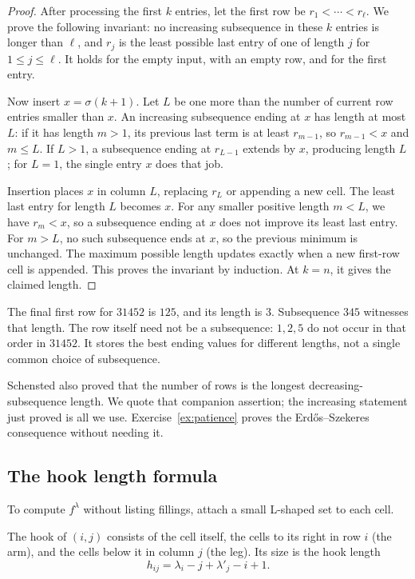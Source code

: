 \begin{proof}
After processing the first $k$ entries, let the first row be $r_1<\cdots<r_\ell$. We prove the following invariant: no increasing subsequence in these $k$ entries is longer than $\ell$, and $r_j$ is the least possible last entry of one of length $j$ for $1\le j\le\ell$. It holds for the empty input, with an empty row, and for the first entry.

Now insert $x=\sigma(k+1)$. Let $L$ be one more than the number of current row entries smaller than $x$. An increasing subsequence ending at $x$ has length at most $L$: if it has length $m>1$, its previous last term is at least $r_{m-1}$, so $r_{m-1}<x$ and $m\le L$. If $L>1$, a subsequence ending at $r_{L-1}$ extends by $x$, producing length $L$; for $L=1$, the single entry $x$ does that job.

Insertion places $x$ in column $L$, replacing $r_L$ or appending a new cell. The least last entry for length $L$ becomes $x$. For any smaller positive length $m<L$, we have $r_m<x$, so a subsequence ending at $x$ does not improve its least last entry. For $m>L$, no such subsequence ends at $x$, so the previous minimum is unchanged. The maximum possible length updates exactly when a new first-row cell is appended. This proves the invariant by induction. At $k=n$, it gives the claimed length.
\end{proof}

The final first row for $31452$ is $125$, and its length is $3$. Subsequence $345$ witnesses that length. The row itself need not be a subsequence: $1,2,5$ do not occur in that order in $31452$. It stores the best ending values for different lengths, not a single common choice of subsequence.

Schensted also proved that the number of rows is the longest decreasing-subsequence length. We quote that companion assertion; the increasing statement just proved is all we use. Exercise~\ref{ex:patience} proves the Erdős--Szekeres consequence without needing it.

\subsection*{The hook length formula}

To compute $f^\lambda$ without listing fillings, attach a small L-shaped set to each cell.

\begin{definition}\label{def:hook}
The hook of $(i,j)$ consists of the cell itself, the cells to its right in row $i$ (the arm), and the cells below it in column $j$ (the leg). Its size is the hook length
\[
h_{ij}=\lambda_i-j+\lambda'_j-i+1.
\]
\end{definition}

